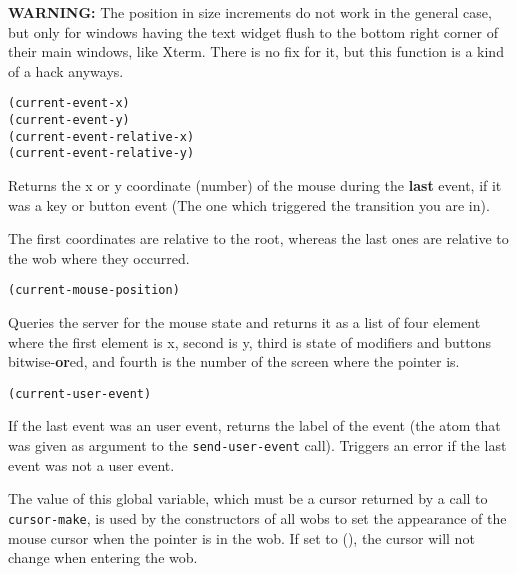 {\bf WARNING:} The position in size increments do not work in the general
case, but only for windows having the text widget flush to the bottom right
corner of their main windows, like Xterm. There is no fix for it, but this
function is a kind of a hack anyways.

        
{\usagefont\begin{verbatim}
(current-event-x)
(current-event-y)
(current-event-relative-x)
(current-event-relative-y)
\end{verbatim}}\usageupspace

Returns the x or y coordinate (number)  of the mouse during the {\bf last}
event, if it was a key or button event (The one which triggered the
transition you are in).

The first coordinates are relative to the root, whereas the last ones are
relative to the wob where they occurred.

        
{\usagefont\begin{verbatim}
(current-mouse-position)
\end{verbatim}}\usageupspace

Queries the server for the mouse state and returns it as a list of
four element where the first element is x, second is y, third is
state of modifiers and buttons bitwise-{\bf or}ed, and fourth
is the number of the screen where the pointer is.


{\usagefont\begin{verbatim}
(current-user-event)
\end{verbatim}}\usageupspace

If the last event was an user event, returns the label of the event (the
atom that was given as argument to the \verb"send-user-event" call).
Triggers an error if the last event was not a user event.

        

The value of this global variable, which must be a cursor returned by a call
to \verb"cursor-make", is used by the constructors of all wobs to set the
appearance of the mouse cursor when the pointer is in the wob. If set to (),
the cursor will not change when entering the wob.

